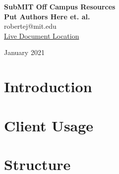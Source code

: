 \documentclass[oneside]{book}
\begin{document}
\begin{titlepage}
\begin{center}
 {\huge\bfseries SubMIT Off Campus Resources\\}
 \vspace{1.5cm}
 {\Large\bfseries Put Authors Here et. al.}\\[5pt]
 robertej@mit.edu\\
 \href{https://latexonline.cc/compile?git=https\%3A\%2F\%2Fgithub.com\%2Frobertej19\%2FSubMITDocs\&target=main.tex\&command=pdflatex\&trackId=1594872205396}{Live Document Location}\\[14pt]
 \vspace{2cm}


 \vfill

 \vfill
{January 2021}
\end{center}
\end{titlepage}

\tableofcontents

%    
    
%    
    

\chapter{Introduction}
    
    
\chapter{Client Usage}
    


\chapter{Structure}
      
    
\end{document}
